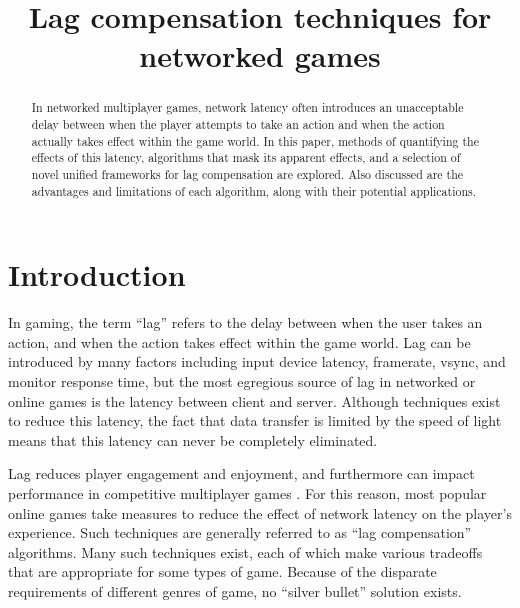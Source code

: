 \documentclass[conference]{IEEEtran}
\begin{document}
	\title{Lag compensation techniques for networked games}
	\author{
	}
	\maketitle

	\begin{abstract}
		In networked multiplayer games, network latency often introduces an unacceptable delay between when the player attempts to take an action and when the action actually takes effect within the game world. In this paper, methods of quantifying the effects of this latency, algorithms that mask its apparent effects, and a selection of novel unified frameworks for lag compensation are explored. Also discussed are the advantages and limitations of each algorithm, along with their potential applications.
	\end{abstract}

	\section{Introduction}


	In gaming, the term ``lag'' refers to the delay between when the user takes an action, and when the action takes effect within the game world. Lag can be introduced by many factors including input device latency, framerate, vsync, and monitor response time, but the most egregious source of lag in networked or online games is the latency between client and server. Although techniques exist to reduce this latency, the fact that data transfer is limited by the speed of light means that this latency can never be completely eliminated.

	Lag reduces player engagement and enjoyment, and furthermore can impact performance in competitive multiplayer games \cite{beigbeder2004effects}. For this reason, most popular online games take measures to reduce the effect of network latency on the player's experience. Such techniques are generally referred to as ``lag compensation'' algorithms. Many such techniques exist, each of which make various tradeoffs that are appropriate for some types of game. Because of the disparate requirements of different genres of game, no ``silver bullet'' solution exists.
\end{document}

